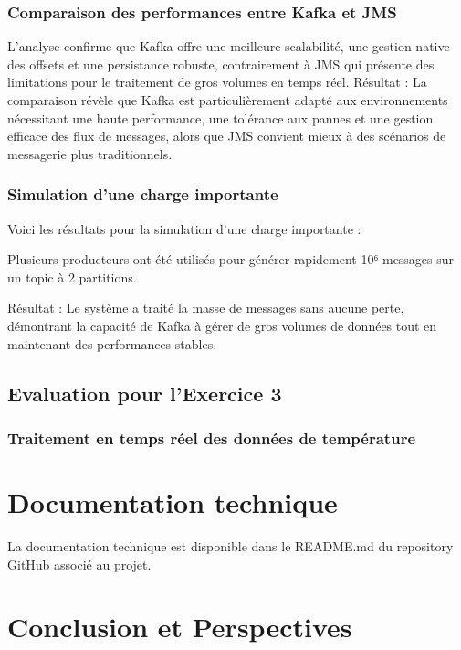 \subsubsection{Comparaison des performances entre Kafka et JMS}

L’analyse confirme que Kafka offre une meilleure scalabilité, une gestion native des offsets et une persistance robuste, contrairement à JMS qui présente des limitations pour le traitement de gros volumes en temps réel.
Résultat : La comparaison révèle que Kafka est particulièrement adapté aux environnements nécessitant une haute performance, une tolérance aux pannes et une gestion efficace des flux de messages, alors que JMS convient mieux à des scénarios de messagerie plus traditionnels.

\subsubsection{Simulation d’une charge importante}

Voici les résultats pour la simulation d’une charge importante :

\item Plusieurs producteurs ont été utilisés pour générer rapidement 10⁶ messages sur un topic à 2 partitions.

\item Résultat : Le système a traité la masse de messages sans aucune perte, démontrant la capacité de Kafka à gérer de gros volumes de données tout en maintenant des performances stables.


\subsection{Evaluation pour l’Exercice 3}

\subsubsection{Traitement en temps réel des données de température}




\section{Documentation technique}\label{sec:documentation-technique}

La documentation technique est disponible dans le README.md du repository GitHub associé au projet.


\section{Conclusion et Perspectives}

